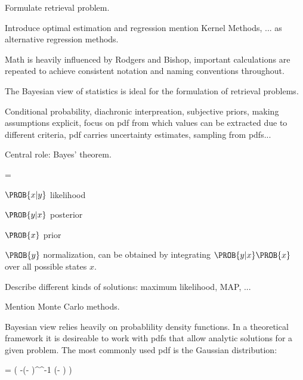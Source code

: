 Formulate retrieval problem.

Introduce optimal estimation and regression mention Kernel Methods, ... as
alternative regression methods.

Math is heavily influenced by Rodgers and Bishop, important calculations are
repeated to achieve consistent notation and naming conventions throughout.

\startsection[title={Bayesian Statistics}]

    The Bayesian view of statistics is ideal for the formulation of retrieval
    problems. 

    Conditional probability, diachronic interpreation, subjective priors,
    making assumptions explicit, focus on pdf from which values can be
    extracted due to different criteria, pdf carries uncertainty estimates,
    sampling from pdfs...

    Central role: Bayes' theorem.
    
    \startformula
         = 
    \stopformula

    $\PROB{x|y}$ likelihood

    $\PROB{y|x}$ posterior

    $\PROB{x}$ prior

    $\PROB{y}$ normalization, can be obtained by integrating $\PROB{y|x}\PROB{x}$
    over all possible states $x$.

     {}

    Describe different kinds of solutions: maximum likelihood, MAP, ...

    Mention Monte Carlo methods.

\stopsection

\startsection[title=The Multivariate Gaussian Distribution]

    Bayesian view relies heavily on probablility density functions. In a
    theoretical framework it is desireable to work with pdfs that allow
    analytic solutions for a given problem. The most commonly used pdf is the
    Gaussian distribution:

    \placeformula[eq:gaussian]
    \startformula
        \GAUSS{\VECX}{\MEANVEC}{\COVMAT}
        = 
          \exp \left( -(\VECX - \MEANVEC)^\top \COVMAT^{-1} (\VECX - \MEANVEC) \right)
    \stopformula

